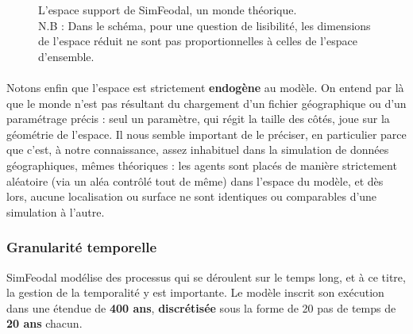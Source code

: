\begin{figure}[H]
	\centering
{}
\caption{L'espace support de SimFeodal, un monde théorique.\\
N.B : Dans le schéma, pour une question de lisibilité, les dimensions de l'espace réduit ne sont pas proportionnelles à celles de l'espace d'ensemble.}
\label{fig:espace-simfeodal}
\end{figure}

\paragraph[Endogène]{} Notons enfin que l'espace est strictement \textbf{endogène} au modèle. On entend par là que le monde n'est pas résultant du chargement d'un fichier géographique ou d'un paramétrage précis : seul un paramètre, qui régit la taille des côtés, joue sur la géométrie de l'espace.
Il nous semble important de le préciser, en particulier parce que c'est, à notre connaissance, assez inhabituel dans la simulation de données géographiques, mêmes théoriques : les agents sont placés de manière strictement aléatoire (via un aléa contrôlé tout de même) dans l'espace du modèle, et dès lors, aucune localisation ou surface ne sont identiques ou comparables d'une simulation à l'autre.


\subsubsection{Granularité temporelle}

SimFeodal modélise des processus qui se déroulent sur le temps long, et à ce titre, la gestion de la temporalité y est importante.
Le modèle inscrit son exécution dans une étendue de \textbf{400 ans}, \textbf{discrétisée} sous la forme de 20 pas de temps de \textbf{20 ans} chacun.

